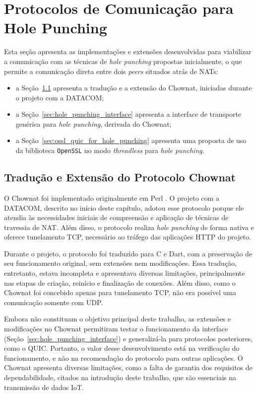 \section{Protocolos de Comunicação para Hole Punching}
\label{sec:hole_punching_protocols}

Esta seção apresenta as implementações e extensões desenvolvidas para viabilizar a comunicação com as técnicas de \textit{hole punching} propostas inicialmente, o que permite a comunicação direta entre dois \textit{peers} situados atrás de NATs:

\begin{itemize}
    \item a Seção~\ref{sec:chownat_translation_extension} apresenta a tradução e a extensão do Chownat, iniciadas durante o projeto com a DATACOM;
    \item a Seção~\ref{sec:hole_punching_interface} apresenta a interface de transporte genérica para \textit{hole punching}, derivada do Chownat;
    \item a Seção~\ref{sec:ossl_quic_for_hole_punching} apresenta uma proposta de uso da biblioteca \texttt{OpenSSL} no modo \textit{threadless} para \textit{hole punching}.
\end{itemize}

\subsection{Tradução e Extensão do Protocolo Chownat}
\label{sec:chownat_translation_extension}

O Chownat foi implementado originalmente em Perl \citep{kamkar2004chownatv07}. O projeto com a DATACOM, descrito no início deste capítulo, adotou esse protocolo porque ele atendia às necessidades iniciais de compreensão e aplicação de técnicas de travessia de NAT. Além disso, o protocolo realiza \textit{hole punching} de forma nativa e oferece tunelamento TCP, necessário ao tráfego das aplicações HTTP do projeto.

Durante o projeto, o protocolo foi traduzido para C e Dart, com a preservação de seu funcionamento original, sem extensões nem modificações. Essa tradução, entretanto, estava incompleta e apresentava diversas limitações, principalmente nas etapas de criação, reinício e finalização de conexões. Além disso, como o Chownat foi concebido apenas para tunelamento TCP, não era possível uma comunicação somente com UDP.

Embora não constituam o objetivo principal deste trabalho, as extensões e modificações no Chownat permitiram testar o funcionamento da interface (Seção~\ref{sec:hole_punching_interface}) e generalizá-la para protocolos posteriores, como o QUIC. Portanto, o valor desse desenvolvimento está na verificação do funcionamento, e não na recomendação do protocolo para outras aplicações. O Chownat apresenta diversas limitações, como a falta de garantia dos requisitos de dependabilidade, citados na introdução deste trabalho, que são essenciais na transmissão de dados IoT.

